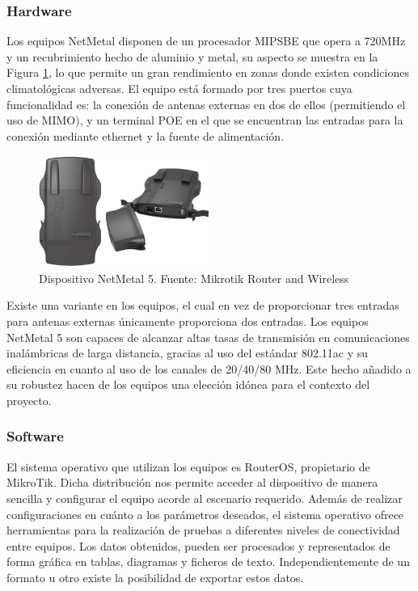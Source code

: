 	\subsubsection{Hardware}
	Los equipos NetMetal disponen de un procesador MIPSBE que opera a 720MHz y un recubrimiento hecho de aluminio y metal, su aspecto se muestra en la Figura \ref{equipo}, lo que permite un gran rendimiento en zonas donde existen condiciones climatológicas adversas. El equipo está formado por tres puertos cuya funcionalidad es: la conexión de antenas externas en dos de ellos (permitiendo el uso de MIMO), y un terminal POE en el que se encuentran las entradas para la conexión mediante ethernet y la fuente de alimentación.
	\begin{figure}[H]
		\centering
		\includegraphics[width=0.5\textwidth]{img/netMetal5.png}
		\caption{Dispositivo NetMetal 5. Fuente: Mikrotik Router and Wireless}
		\label{equipo}
	\end{figure}
	Existe una variante en los equipos, el cual en vez de proporcionar tres entradas para antenas externas únicamente proporciona dos entradas.
	Los equipos NetMetal 5 son capaces de alcanzar altas tasas de transmisión en comunicaciones inalámbricas de larga distancia, gracias al uso del estándar 802.11ac y su eficiencia en cuanto al uso de los canales de 20/40/80 MHz. Este hecho añadido a su robustez hacen de los equipos una elección idónea para el contexto del proyecto.
	
	
	
	\subsubsection{Software}
	El sistema operativo que utilizan los equipos es RouterOS, propietario de MikroTik. Dicha distribución nos permite acceder al dispositivo de manera sencilla y configurar el equipo acorde al escenario requerido. Además de realizar configuraciones en cuánto a los parámetros deseados, el sistema operativo ofrece herramientas para la realización de pruebas a diferentes niveles de conectividad entre equipos. Los datos obtenidos, pueden ser procesados y representados de forma gráfica en tablas, diagramas y ficheros de texto. Independientemente de un formato u otro existe la posibilidad de exportar estos datos.\\
	
